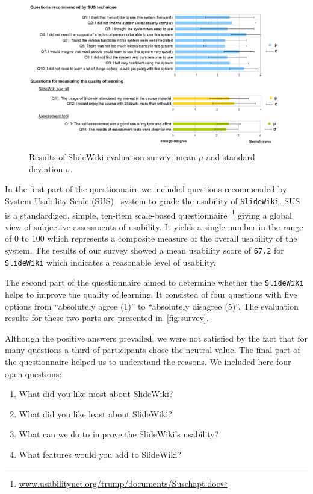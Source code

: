 \documentclass[PhD, Submit, ngerman,UKenglish,table]{scrbook}
\begin{document}
\begin{figure}[t!]
	\centering
		\includegraphics[width=\textwidth]{images/survey.png}
	\caption{Results of SlideWiki evaluation survey: mean $\mu$ and standard deviation $\sigma$.}
	\label{fig:survey}
\end{figure}


In the first part of the questionnaire we included questions recommended by System Usability Scale (SUS)~\cite{SUS2009} system to grade the usability of \texttt{SlideWiki}.
SUS is a standardized, simple, ten-item scale-based questionnaire~\footnote{\url{www.usabilitynet.org/trump/documents/Suschapt.doc}} giving a global view of subjective assessments of usability.
It yields a single number in the range of 0 to 100 which represents a composite measure of the overall usability of the system.
The results of our survey showed a mean usability score of \texttt{67.2} for \texttt{SlideWiki} which indicates a reasonable level of usability.

The second part of the questionnaire aimed to determine whether the \texttt{SlideWiki} helps to improve the quality of learning.
It consisted of four questions with five options from ``absolutely agree (1)''  to ``absolutely disagree (5)''.
The evaluation results for these two parts are presented in~\autoref{fig:survey}.

Although the positive answers prevailed, we were not satisfied by the fact that for many questions a third of participants chose the neutral value.
The final part of the questionnaire helped us to understand the reasons.
We included here four open questions:

\begin{enumerate}
	\item What did you like most about SlideWiki?
	\item What did you like least about SlideWiki?
	\item What can we do to improve the SlideWiki's usability?
	\item What features would you add to SlideWiki?
\end{enumerate}
\end{document}
